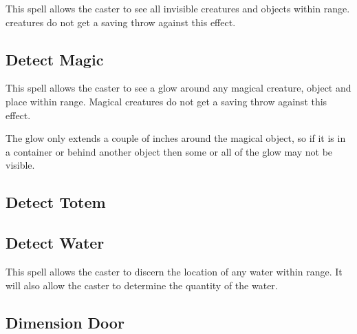 \begin{multicols*}{2}
This spell allows the caster to see all invisible creatures and objects within range.  creatures do not get a saving throw against this effect.

\subsection{Detect Magic}\label{spell:Detect Magic}

This spell allows the caster to see a glow around any magical creature, object and place within range. Magical creatures do not get a saving throw against this effect.

The glow only extends a couple of inches around the magical object, so if it is in a container or behind another object then some or all of the glow may not be visible.

\subsection{Detect Totem}\label{spell:Detect Totem}


\subsection{Detect Water}\label{spell:Detect Water}

This spell allows the caster to discern the location of any water within range. It will also allow the caster to determine the quantity of the water.

\subsection{Dimension Door}\label{spell:Dimension Door}
\end{multicols*}
